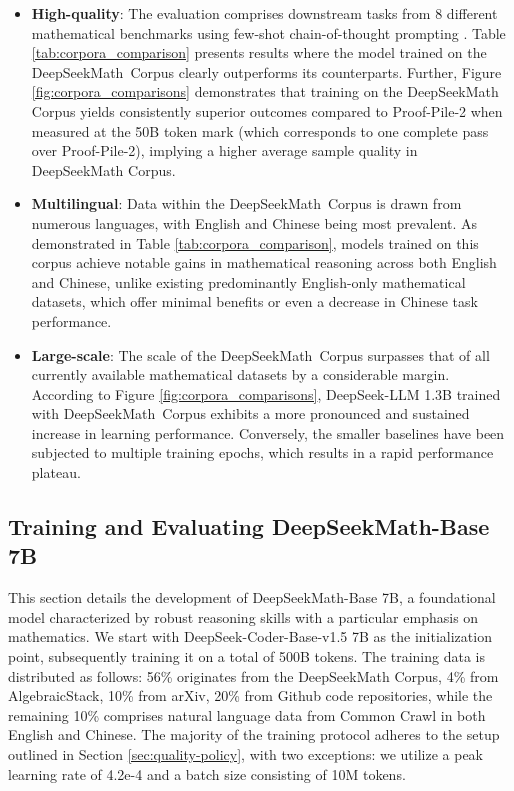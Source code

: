 \begin{itemize}[topsep=0pt]
    \item \textbf{High-quality}:
    The evaluation comprises downstream tasks from 8 different mathematical benchmarks using few-shot chain-of-thought prompting \cite{cot}. Table \ref{tab:corpora_comparison} presents results where the model trained on the DeepSeekMath~Corpus clearly outperforms its counterparts. Further, Figure \ref{fig:corpora_comparisons} demonstrates that training on the DeepSeekMath Corpus yields consistently superior outcomes compared to Proof-Pile-2 when measured at the 50B token mark (which corresponds to one complete pass over Proof-Pile-2), implying a higher average sample quality in DeepSeekMath Corpus.
    \item \textbf{Multilingual}:
    Data within the DeepSeekMath~Corpus is drawn from numerous languages, with English and Chinese being most prevalent. As demonstrated in Table \ref{tab:corpora_comparison}, models trained on this corpus achieve notable gains in mathematical reasoning across both English and Chinese, unlike existing predominantly English-only mathematical datasets, which offer minimal benefits or even a decrease in Chinese task performance.
    \item \textbf{Large-scale}:
    The scale of the DeepSeekMath~Corpus surpasses that of all currently available mathematical datasets by a considerable margin. According to Figure \ref{fig:corpora_comparisons}, DeepSeek-LLM 1.3B trained with DeepSeekMath~Corpus exhibits a more pronounced and sustained increase in learning performance. Conversely, the smaller baselines have been subjected to multiple training epochs, which results in a rapid performance plateau.
\end{itemize}

\subsection{Training and Evaluating DeepSeekMath-Base 7B}

This section details the development of DeepSeekMath-Base 7B, a foundational model characterized by robust reasoning skills with a particular emphasis on mathematics. We start with DeepSeek-Coder-Base-v1.5 7B \citep{deepseek-coder} as the initialization point, subsequently training it on a total of 500B tokens. The training data is distributed as follows: 56\% originates from the DeepSeekMath Corpus, 4\% from AlgebraicStack, 10\% from arXiv, 20\% from Github code repositories, while the remaining 10\% comprises natural language data from Common Crawl in both English and Chinese. The majority of the training protocol adheres to the setup outlined in Section \ref{sec:quality-policy}, with two exceptions: we utilize a peak learning rate of 4.2e-4 and a batch size consisting of 10M tokens.

